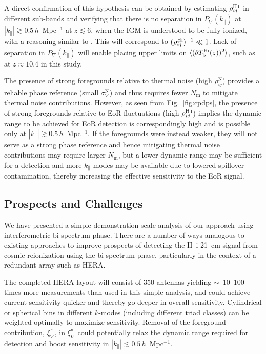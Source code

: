 \documentclass[
reprint,
superscriptaddress,
amsmath,
amssymb,
aps,
prd
]{revtex4-1}
\newcommand{\HI}{H\,{\sc i}}
\begin{document}
A direct confirmation of this hypothesis can be obtained by estimating $\rho_{ij}^\textrm{\HI}$ in different sub-bands and verifying that there is no separation in $P_\nabla(k_\parallel)$ at $|k_\parallel| \gtrsim 0.5\,h$~Mpc$^{-1}$ at $z\lesssim 6$, when the IGM is understood to be fully ionized, with a reasoning similar to \cite{pob16b}. This will correspond to $(\rho_{ij}^\textrm{H{\sc i}})^{-1} \ll 1$. Lack of separation in $P_\nabla(k_\parallel)$ will enable placing upper limits on $\langle (\delta T_\textrm{b}^\textrm{H{\sc i}}(z))^2\rangle$, such as at $z\approx 10.4$ in this study.

The presence of strong foregrounds relative to thermal noise (high $\rho_{ij}^\textrm{N}$) provides a reliable phase reference (small $\sigma_\nabla^\textrm{N}$) and thus requires fewer $N_\textrm{m}$ to mitigate thermal noise contributions. However, as seen from Fig.~\ref{fig:cpdps}, the presence of strong foregrounds relative to EoR fluctuations (high $\rho_{ij}^\textrm{\HI}$) implies the dynamic range to be achieved for EoR detection is correspondingly high and is possible only at $|k_\parallel| \gtrsim 0.5\,h$~Mpc$^{-1}$. If the foregrounds were instead weaker, they will not serve as a strong phase reference and hence mitigating thermal noise contributions may require larger $N_\textrm{m}$, but a lower dynamic range may be sufficient for a detection and more $k_\parallel$-modes may be available due to lowered spillover contamination, thereby increasing the effective sensitivity to the EoR signal. 

\subsection{Prospects and Challenges}\label{sec:prospects-challenges}

We have presented a simple demonstration-scale analysis of our approach using interferometric bi-spectrum phase. There are a number of ways analogous to existing approaches to improve prospects of detecting the H~{\sc i} 21~cm signal from cosmic reionization using the bi-spectrum phase, particularly in the context of a redundant array such as HERA. 

The completed HERA layout will consist of 350 antennas yielding $\sim$~10--100 times more measurements than used in this simple analysis, and could achieve current sensitivity quicker and thereby go deeper in overall sensitivity. Cylindrical or spherical bins in different $k$-modes (including different triad classes) can be weighted optimally \cite{liu14a,liu14b,dil15} to maximize sensitivity. Removal of the foreground contribution, $\xi_\nabla^\textrm{F}$, in $\xi_\nabla^\textrm{m}$ could potentially relax the dynamic range required for detection and boost sensitivity in $|k_\parallel| \lesssim 0.5\,h$~Mpc$^{-1}$.
\end{document}
